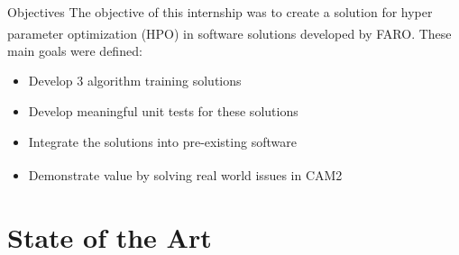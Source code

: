 \documentclass[10pt]{beamer}
\newcommand{\farons}[0]{FARO\textsuperscript{\textregistered}}
\begin{document}
  \begin{frame}{Objectives}
    The objective of this internship was to create a solution for hyper parameter optimization (HPO) in software solutions developed by \farons. These main goals were defined:
    \begin{itemize}
      \item Develop 3 algorithm training solutions
      \item Develop meaningful unit tests for these solutions
      \item Integrate the solutions into pre-existing software
      \item Demonstrate value by solving real world issues in CAM2\textsuperscript{\textregistered}
    \end{itemize}
  \end{frame}

  \section{State of the Art}
\end{document}
